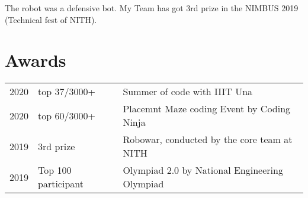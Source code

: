 \documentclass[]{deedy-resume-openfont}
\begin{document}
\begin{minipage}[t]{0.66\textwidth}
The robot was a defensive bot.
My Team has got 3rd prize in the NIMBUS 2019 (Technical fest of NITH). 
\sectionsep



\section{Awards} 
\begin{tabular}{rll}
2020	     & top 37/3000+  & Summer of code with IIIT Una\\
2020	     & top 60/3000+   & Placemnt Maze coding Event by Coding Ninja\\
2019	     & 3rd prize      &  Robowar, conducted by the core team at NITH\\
2019     & Top 100 participant &  Olympiad 2.0 by National Engineering Olympiad  \\
\end{tabular}
\sectionsep


\end{minipage} 
\end{document}
